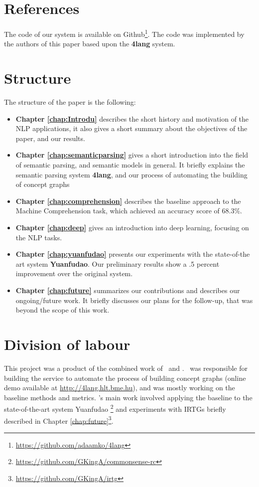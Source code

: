 \section{References}
The code of our system is available on Github\footnote{\url{https://github.com/adaamko/4lang}}. The code was implemented by the authors of this paper based upon the \textbf{4lang} system.

\section{Structure}
The structure of the paper is the following:
\begin{itemize}
	\item \textbf{Chapter \ref{chap:Introdu}} describes the short history and motivation of the NLP applications, it also gives a short summary about the objectives of the paper, and our results.
	\item \textbf{Chapter \ref{chap:semanticparsing}} gives a short introduction into the field of semantic parsing, and semantic models in general. It briefly explains the semantic parsing system \textbf{4lang}, and our process of automating the building of concept graphs
	\item \textbf{Chapter \ref{chap:comprehension}} describes the baseline approach to the Machine Comprehension task, which achieved an accuracy score of $68.3\%$.
	\item \textbf{Chapter \ref{chap:deep}} gives an introduction into deep learning, focusing on the NLP tasks.
	\item \textbf{Chapter \ref{chap:yuanfudao}} presents our experiments with the state-of-the art system \textbf{Yuanfudao}. Our preliminary results show a .5 percent improvement over the original system.
	\item \textbf{Chapter \ref{chap:future}} summarizes our contributions and describes our ongoing/future work. It briefly discusses our plans for the follow-up, that was beyond the scope of this work.
\end{itemize}

\section{Division of labour}
This project was a product of the combined work of \vikszerzo \ and \vikszerzos. \vikszerzo \ was responsible for building the service to automate the process of building concept graphs (online demo available at \url{http://4lang.hlt.bme.hu}), and was mostly working on the baseline methods and metrics. \vikszerzos's main work involved applying the baseline to the state-of-the-art system Yuanfudao \cite{Wang:2018}\footnote{\url{https://github.com/GKingA/commonsense-rc}} and experiments with IRTGs briefly described in Chapter \ref{chap:future}\footnote{\url{https://github.com/GKingA/irtg}}.